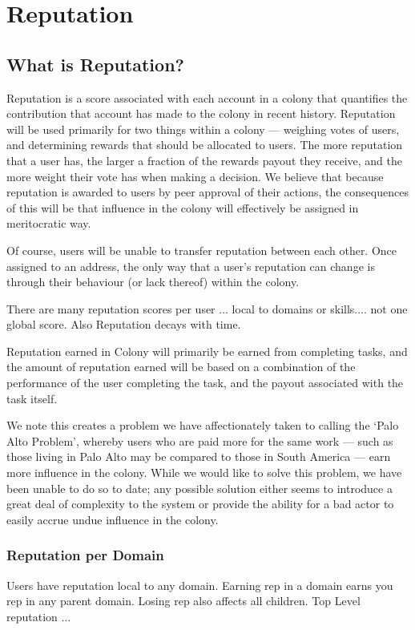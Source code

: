 \section{Reputation}
\subsection{What is Reputation?}

Reputation is a score associated with each account in a colony that quantifies the contribution that account has made to the colony in recent history. Reputation will be used primarily for two things within a colony --- weighing votes of users, and determining rewards that should be allocated to users. The more reputation that a user has, the larger a fraction of the rewards payout they receive, and the more weight their vote has when making a decision. We believe that because reputation is awarded to users by peer approval of their actions, the consequences of this will be that influence in the colony will effectively be assigned in meritocratic way.

Of course, users will be unable to transfer reputation between each other. Once assigned to an address, the only way that a user's reputation can change is through their behaviour (or lack thereof) within the colony. 

There are many reputation scores per user ... local to domains or skills.... not one global score. Also Reputation decays with time.



Reputation earned in Colony will primarily be earned from completing tasks, and the amount of reputation earned will be based on a combination of the performance of the user completing the task, and the payout associated with the task itself.

We note this creates a problem we have affectionately taken to calling the `Palo Alto Problem', whereby users who are paid more for the same work --- such as those living in Palo Alto may be compared to those in South America --- earn more influence in the colony. While we would like to solve this problem, we have been unable to do so to date; any possible solution either seems to introduce a great deal of complexity to the system or provide the ability for a bad actor to easily accrue undue influence in the colony.

\subsubsection{Reputation per Domain}
Users have reputation local to any domain. Earning rep in a domain earns you rep in any parent domain. Losing rep also affects all children.
Top Level reputation ...


